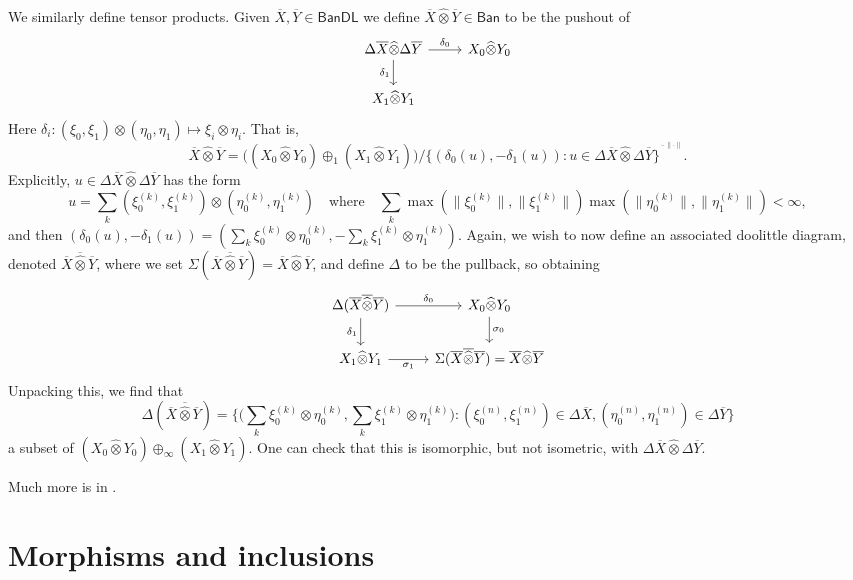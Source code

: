 \documentclass[a4paper,11pt]{article}
\theoremstyle{plain}
\theoremstyle{remark}
\newcommand{\msf}[1]{\mathsf{#1}}
\newcommand{\proten}{\widehat\otimes}
\begin{document}
We similarly define tensor products.  Given $\overline X,\overline Y \in \msf{BanDL}$ we define $\overline X \proten \overline Y \in \msf{Ban}$ to be the pushout of
\[ \begin{tikzcd}
  \Delta\overline X \proten \Delta\overline Y \arrow[r, "\delta_0"] \arrow[d, "\delta_1"'] & X_0 \proten Y_0 \\ X_1\proten Y_1
\end{tikzcd} \]
Here $\delta_i \colon (\xi_0,\xi_1) \otimes (\eta_0,\eta_1) \mapsto \xi_i \otimes \eta_i$.  That is,
\[ \overline X \proten \overline Y = \big(  (X_0 \proten Y_0) \oplus_1 ( X_1 \proten Y_1) \big) / \big\{ (\delta_0(u),-\delta_1(u)) : u \in \Delta\overline X \proten \Delta\overline Y \big\}^{\overline{\phantom{x}}^{\|\cdot\|}}. \]
Explicitly, $u\in \Delta\overline X \proten \Delta\overline Y$ has the form 
\[ u = \sum_k (\xi_0^{(k)}, \xi_1^{(k)}) \otimes (\eta_0^{(k)}, \eta_1^{(k)})
\quad\text{where}\quad
\sum_k \max(\|\xi_0^{(k)}\|, \|\xi_1^{(k)}\|) \max(\|\eta_0^{(k)}\|, \|\eta_1^{(k)}\|) < \infty, \]
and then $(\delta_0(u),-\delta_1(u)) = (\sum_k \xi_0^{(k)}\otimes \eta_0^{(k)}, -\sum_k \xi_1^{(k)} \otimes \eta_1^{(k)})$.  Again, we wish to now define an associated doolittle diagram, denoted $\overline X \overline{\proten} \overline Y$, where we set $\Sigma(\overline X \overline{\proten} \overline Y) = \overline X \proten \overline Y$, and define $\Delta$ to be the pullback, so obtaining
\[ \begin{tikzcd}
\Delta(\overline X \overline{\proten} \overline Y) \arrow[r, "\delta_0"] \arrow[d, "\delta_1"'] & X_0 \proten Y_0 \arrow[d, "\sigma_0"] \\ X_1\proten Y_1 \arrow[r, "\sigma_1"'] & \Sigma(\overline X \overline{\proten} \overline Y) = \overline X \proten \overline Y
\end{tikzcd} \]
Unpacking this, we find that
\[ \Delta(\overline X \overline{\proten} \overline Y)
= \big\{ \big(\sum_k \xi_0^{(k)} \otimes \eta_0^{(k)}, \sum_k\xi_1^{(k)}\otimes\eta_1^{(k)}\big)  : (\xi_0^{(n)}, \xi_1^{(n)}) \in \Delta\overline X, (\eta_0^{(n)}, \eta_1^{(n)}) \in \Delta\overline Y\big\} \]
a subset of $(X_0\proten Y_0)\oplus_\infty (X_1\proten Y_1)$.  One can check that this is isomorphic, but not isometric, with $\Delta\overline X \proten \Delta\overline Y$.

Much more is in \cite[Section IV.2]{KP_InterpolationFunctorsDuality}.


\section{Morphisms and inclusions}
\end{document}
